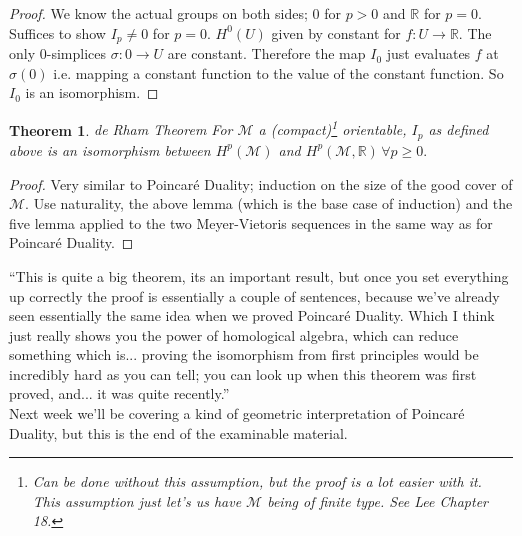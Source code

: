 \documentclass[10pt]{article}
\theoremstyle{plain}
\newtheorem{thm}{Theorem}[section] %
\theoremstyle{definition}
\newcommand{\Real}{\mathbb{R}}
\newcommand{\man}{\mathcal{M}}
\newcommand{\mysection}[1]{
    \setcounter{thm}{0}
    \section*{#1}
    \addcontentsline{toc}{section}{#1}
    \addtocounter{section}{1}
    \setcounter{subsection}{0}

}
\begin{document}
\begin{proof}
    We know the actual groups on both sides; 0 for $p >0$ and $\Real$ for $p =0$. Suffices to show $I_p\neq 0$ for $p=0$. $H^0(U)$ given by constant for $f:U\to\Real$. The only 0-simplices $\sigma : {0} \to U$ are constant. Therefore the map $I_0$ just evaluates $f$ at $\sigma(0)$ i.e. mapping a constant function to the value of the constant function. So $I_0$ is an isomorphism.
\end{proof}

\begin{thm}{de Rham Theorem}
    For $\man$ a (compact)\footnote{Can be done without this assumption, but the proof is a lot easier with it. This assumption just let's us have $\man$ being of finite type. See Lee Chapter 18.} orientable, $I_p$ as defined above is an isomorphism between $H^p(\man)$ and $H^p(\man,\Real) \,\forall p\geq 0.$
\end{thm}

\begin{proof}
    Very similar to Poincar\'e Duality; induction on the size of the good cover of $\man$. Use naturality, the above lemma (which is the base case of induction) and the five lemma applied to the two Meyer-Vietoris sequences in the same way as for Poincar\'e Duality.
\end{proof}
``This is quite a big theorem, its an important result, but once you set everything up correctly the proof is essentially a couple of sentences, because we've already seen essentially the same idea when we proved Poincar\'e Duality. Which I think just really shows you the power of homological algebra, which can reduce something which is... proving the isomorphism from first principles would be incredibly hard as you can tell; you can look up when this theorem was first proved, and... it was quite recently.''\\
Next week we'll be covering a kind of geometric interpretation of Poincar\'e Duality, but this is the end of the examinable material.

\end{document}
